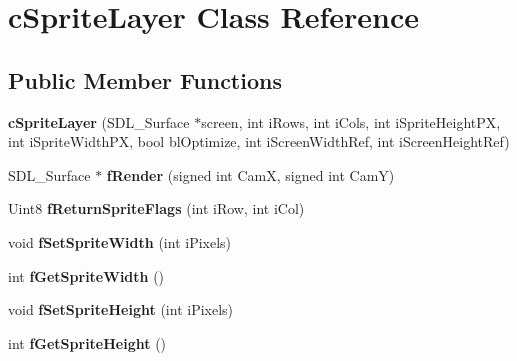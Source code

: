 \hypertarget{classc_sprite_layer}{\section{c\-Sprite\-Layer Class Reference}
\label{classc_sprite_layer}
}
\subsection*{Public Member Functions}
\begin{DoxyCompactItemize}
\item 
\hypertarget{classc_sprite_layer_a0d17c2ce0ee9e6843f905ece2cd4ea98}{{\bfseries c\-Sprite\-Layer} (S\-D\-L\-\_\-\-Surface $\ast$screen, int i\-Rows, int i\-Cols, int i\-Sprite\-Height\-P\-X, int i\-Sprite\-Width\-P\-X, bool bl\-Optimize, int i\-Screen\-Width\-Ref, int i\-Screen\-Height\-Ref)}\label{classc_sprite_layer_a0d17c2ce0ee9e6843f905ece2cd4ea98}

\item 
\hypertarget{classc_sprite_layer_ab6962819241e36e554c0559726fca708}{S\-D\-L\-\_\-\-Surface $\ast$ {\bfseries f\-Render} (signed int Cam\-X, signed int Cam\-Y)}\label{classc_sprite_layer_ab6962819241e36e554c0559726fca708}

\item 
\hypertarget{classc_sprite_layer_a84650f8fab3823252ab60d464dfb6599}{Uint8 {\bfseries f\-Return\-Sprite\-Flags} (int i\-Row, int i\-Col)}\label{classc_sprite_layer_a84650f8fab3823252ab60d464dfb6599}

\item 
\hypertarget{classc_sprite_layer_a6ec5ded5090bebcfacdbb7ced1a39811}{void {\bfseries f\-Set\-Sprite\-Width} (int i\-Pixels)}\label{classc_sprite_layer_a6ec5ded5090bebcfacdbb7ced1a39811}

\item 
\hypertarget{classc_sprite_layer_ae0a59d8841d6d9b6e70e9617df2e3385}{int {\bfseries f\-Get\-Sprite\-Width} ()}\label{classc_sprite_layer_ae0a59d8841d6d9b6e70e9617df2e3385}

\item 
\hypertarget{classc_sprite_layer_acf20667a25f361e4407120d30a367aa6}{void {\bfseries f\-Set\-Sprite\-Height} (int i\-Pixels)}\label{classc_sprite_layer_acf20667a25f361e4407120d30a367aa6}

\item 
\hypertarget{classc_sprite_layer_ae52da0b10607de597a21b134afbded60}{int {\bfseries f\-Get\-Sprite\-Height} ()}\label{classc_sprite_layer_ae52da0b10607de597a21b134afbded60}


\end{DoxyCompactItemize}

